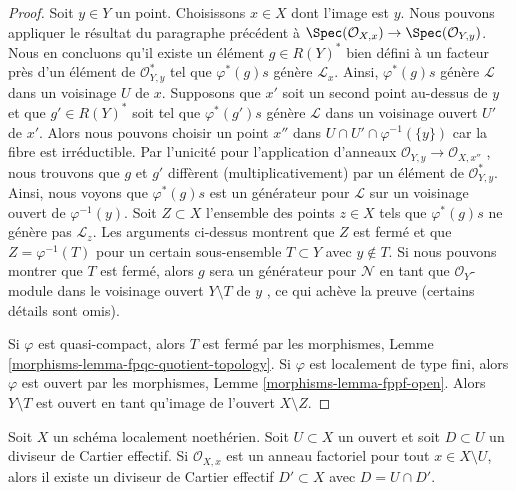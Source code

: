 \begin{proof}
\medskip\noindent
Soit  $y \in Y$  un point. Choisissons  $x \in X$  dont l'image est  $y$.
Nous pouvons appliquer le résultat du paragraphe précédent à  $\Spec(\mathcal{O}_{X, x}) \to \Spec(\mathcal{O}_{Y, y})$. Nous en
concluons qu'il existe un élément  $g \in R(Y)^*$  bien défini à un facteur près d'un
élément de  $\mathcal{O}_{Y, y}^*$  tel que  $\varphi^*(g)s$  génère  $\mathcal{L}_x$. Ainsi,
 $\varphi^*(g)s$  génère  $\mathcal{L}$  dans un voisinage  $U$  de  $x$.
Supposons que  $x'$  soit un second point au-dessus de  $y$  et que
 $g' \in R(Y)^*$  soit tel que  $\varphi^*(g')s$  génère  $\mathcal{L}$  dans un voisinage
ouvert  $U'$  de  $x'$. Alors nous pouvons choisir un point
 $x''$  dans  $U \cap U' \cap \varphi^{-1}(\{y\})$  car la fibre est irréductible. Par l'unicité pour
l'application d'anneaux  $\mathcal{O}_{Y, y} \to \mathcal{O}_{X, x''}$ , nous trouvons que  $g$  et
 $g'$  diffèrent (multiplicativement) par un élément de  $\mathcal{O}_{Y, y}^*$. Ainsi,
nous voyons que  $\varphi^*(g)s$  est un générateur pour  $\mathcal{L}$  sur un voisinage
ouvert de  $\varphi^{-1}(y)$. Soit  $Z \subset X$  l'ensemble des points  $z \in X$  tels
que  $\varphi^*(g)s$  ne génère pas  $\mathcal{L}_z$. Les arguments ci-dessus montrent que
 $Z$  est fermé et que  $Z = \varphi^{-1}(T)$  pour un certain sous-ensemble
 $T \subset Y$  avec  $y \not \in T$. Si nous pouvons montrer que  $T$  est
fermé, alors  $g$  sera un générateur pour  $\mathcal{N}$  en tant que
 $\mathcal{O}_Y$-module dans le voisinage ouvert  $Y \setminus T$  de  $y$ ,
ce qui achève la preuve (certains détails sont omis).

\medskip\noindent
Si  $\varphi$  est quasi-compact, alors  $T$  est fermé par les
morphismes, Lemme  \ref{morphisms-lemma-fpqc-quotient-topology}. Si  $\varphi$  est localement de type fini, alors
 $\varphi$  est ouvert par les morphismes, Lemme  \ref{morphisms-lemma-fppf-open}. Alors  $Y \setminus T$ 
est ouvert en tant qu'image de l'ouvert  $X \setminus Z$.
\end{proof}

\begin{lemma}
\label{lemma-closure-effective-cartier-divisor}
Soit  $X$  un schéma localement noethérien. Soit  $U \subset X$  un ouvert et
soit  $D \subset U$  un diviseur de Cartier effectif. Si  $\mathcal{O}_{X, x}$  est un anneau factoriel pour
tout  $x \in X \setminus U$, alors il existe un diviseur de Cartier effectif  $D' \subset X$ 
avec  $D = U \cap D'$.
\end{lemma}

